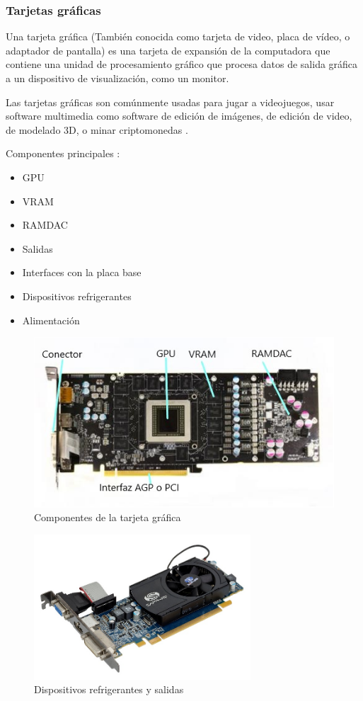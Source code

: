 \subsubsection{Tarjetas gráficas}

Una tarjeta gráfica (También conocida como tarjeta de video, placa de vídeo, o adaptador de pantalla) es una tarjeta de expansión de la computadora que contiene una unidad de procesamiento gráfico que procesa datos de salida gráfica a un dispositivo de visualización, como un monitor.

Las tarjetas gráficas son comúnmente usadas para jugar a videojuegos, usar software multimedia como software de edición de imágenes, de edición de video, de modelado 3D, o minar criptomonedas \cite{wikitarjetagrafica}.

Componentes principales \cite{juanpblogs}:

\begin{itemize}
  \item GPU
  \item VRAM
  \item RAMDAC
  \item Salidas
  \item Interfaces con la placa base
  \item Dispositivos refrigerantes
  \item Alimentación
\end{itemize}

\begin{figure}
  \centering
  \includegraphics[scale=0.8]{imagenes/componentes-tarjeta.png}
  \caption{Componentes de la tarjeta gráfica}
\end{figure}

\begin{figure}
  \centering
  \includegraphics[scale=0.9]{imagenes/dispositivos-refrigerante.png}
  \caption{Dispositivos refrigerantes y salidas}
\end{figure}

